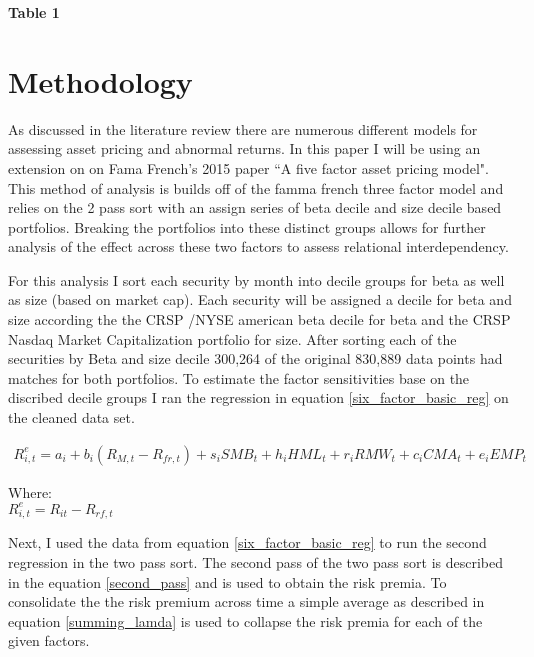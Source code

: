 \documentclass[12pt,oneside,reqno]{amsart}
\begin{document}
 
 \begin{center}
     \textbf{Table 1}\\
 
 \end{center}
 
\section{Methodology}
\label{Methodology}
As discussed in the literature review there are numerous different models for assessing asset pricing and abnormal returns. In this paper I will be using an extension on on Fama French's 2015 paper ``A five factor asset pricing model". This method of analysis is builds off of the famma french three factor model and relies on the 2 pass sort with an assign series of beta decile and size decile based portfolios. Breaking the portfolios into these distinct groups allows for further analysis of the effect across these two factors to assess relational interdependency. 

For this analysis I sort each security by month into decile groups for beta as well as size (based on market cap). Each security will be assigned a decile for beta and size according the the CRSP /NYSE american beta decile for beta and the CRSP Nasdaq Market Capitalization portfolio for size. After sorting each of the securities by Beta and size decile  300,264 of the original 830,889 data points had matches for both portfolios. To estimate the factor sensitivities base on the discribed decile groups I ran the regression in equation \eqref{six_factor_basic_reg} on the cleaned data set. 






\begin{equation}
\begin{split}
    R_{i,t}^e = a_i+b_i(R_{M,t}-R_{fr,t})+s_iSMB_t+ h_iHML_t+  r_iRMW_t+c_iCMA_t+e_iEMP_t
    \end{split}
    \label{six_factor_basic_reg}
\end{equation}

\begin{center}
Where:\\
    $R_{i,t}^e = R_{it}-R_{rf,t}$
\end{center}

Next, I used the data from equation \eqref{six_factor_basic_reg} to run the second regression in the two pass sort. The second pass of the two pass sort is  described in the equation  \eqref{second_pass} and is used to obtain the risk premia. To consolidate the the risk premium across time a simple average as described in equation \eqref{summing_lamda} is used to collapse the risk premia for each of the given factors. 
\end{document}
